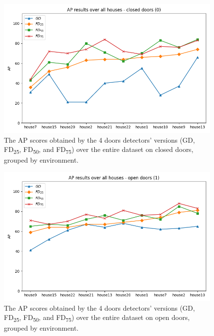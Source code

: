 \begin{figure}[h!]
	\centering
		\includegraphics[width=\linewidth]{images/all_houses_results_closed.png}
	\caption{The AP scores obtained by the 4 doors detectors' versions (\textsf{GD}, \textsf{FD\textsubscript{25}}, \textsf{FD\textsubscript{50}}, and \textsf{FD\textsubscript{75}}) over the entire dataset on closed doors, grouped by environment. }
	\label{fig:all_houses_closed}
\end{figure}

\begin{figure}[h!]
	\centering
	\includegraphics[width=\linewidth]{images/all_houses_results_open.png}
	\caption{The AP scores obtained by the 4 doors detectors' versions (\textsf{GD}, \textsf{FD\textsubscript{25}}, \textsf{FD\textsubscript{50}}, and \textsf{FD\textsubscript{75}}) over the entire dataset on open doors, grouped by environment.}
	\label{fig:all_houses_open}
\end{figure}

